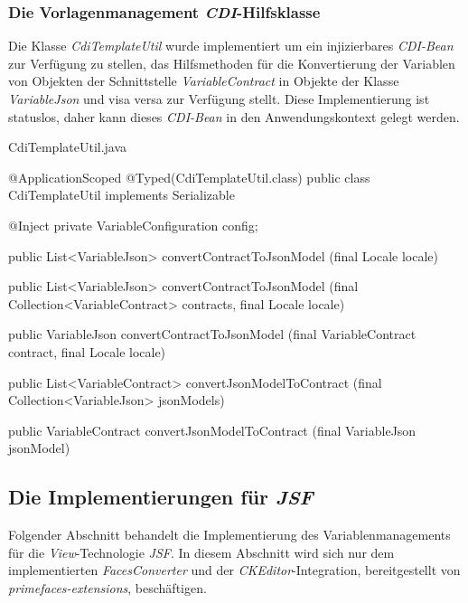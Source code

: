 \subsubsection{Die Vorlagenmanagement \emph{CDI}-Hilfsklasse}
Die Klasse \emph{CdiTemplateUtil} wurde implementiert um ein injizierbares \emph{CDI-Bean} zur Verfügung zu stellen, das Hilfsmethoden für die Konvertierung der Variablen von Objekten der Schnittstelle \emph{VariableContract} in Objekte der Klasse \emph{VariableJson} und visa versa zur Verfügung stellt. Diese Implementierung ist statuslos, daher kann dieses \emph{CDI-Bean} in den Anwendungskontext gelegt werden.
\begin{program}[h]
\caption{CdiTemplateUtil.java}
\label{prog:cdiTemplateUtil}
\begin{JavaCode}
@ApplicationScoped
@Typed(CdiTemplateUtil.class)
public class CdiTemplateUtil implements Serializable {

    @Inject
    private VariableConfiguration config;

    public List<VariableJson> convertContractToJsonModel
    						  (final Locale locale) {
    }

    public List<VariableJson> convertContractToJsonModel
    		(final Collection<VariableContract> contracts,
             final Locale locale) {
    }

    public VariableJson convertContractToJsonModel
           (final VariableContract contract,
            final Locale locale) {
    }
	
    public List<VariableContract> convertJsonModelToContract
    							 (final Collection<VariableJson> jsonModels) {
    }

    public VariableContract convertJsonModelToContract
                            (final VariableJson jsonModel) {
    }
}
\end{JavaCode}
\end{program}
\newpage
\subsection{Die Implementierungen für \emph{JSF}}
\label{sec:sub-impl-integartion-jsf}
Folgender Abschnitt behandelt die Implementierung des Variablenmanagements für die \emph{View}-Technologie \emph{JSF}. In diesem Abschnitt wird sich nur dem implementierten \emph{FacesConverter} und der \emph{CKEditor}-Integration, bereitgestellt von \emph{primefaces-extensions}, beschäftigen.

